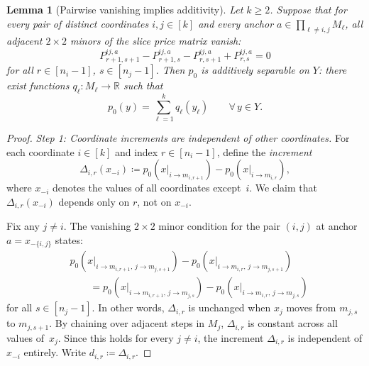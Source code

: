 \documentclass[11pt]{article}
\newtheorem{lemma}[theorem]{Lemma}
\newcommand{\R}{\mathbb{R}}
\begin{document}
\begin{lemma}[Pairwise vanishing implies additivity]\label{lem:vanishing}
Let $k \geq 2$.  Suppose that for every pair of distinct coordinates $i, j \in [k]$
and every anchor $a \in \prod_{\ell \neq i,j} M_\ell$,
all adjacent $2 \times 2$ minors of the slice price matrix vanish:
\[
  P^{ij,a}_{r+1,s+1} - P^{ij,a}_{r+1,s} - P^{ij,a}_{r,s+1} + P^{ij,a}_{r,s} = 0
\]
for all $r \in [n_i - 1]$, $s \in [n_j - 1]$.
Then $p_0$ is additively separable on $Y$: there exist functions $q_\ell\colon M_\ell \to \R$
such that
\[
  p_0(y) = \sum_{\ell=1}^k q_\ell(y_\ell) \qquad \forall\, y \in Y.
\]
\end{lemma}

\begin{proof}
\emph{Step 1: Coordinate increments are independent of other coordinates.}
For each coordinate $i \in [k]$ and index $r \in [n_i - 1]$, define the \emph{increment}
\[
  \Delta_{i,r}(x_{-i}) \coloneqq p_0(x|_{i \to m_{i,r+1}}) - p_0(x|_{i \to m_{i,r}}),
\]
where $x_{-i}$ denotes the values of all coordinates except~$i$.
We claim that $\Delta_{i,r}(x_{-i})$ depends only on $r$, not on $x_{-i}$.

Fix any $j \neq i$.  The vanishing $2\times 2$ minor condition for the pair $(i,j)$
at anchor $a = x_{-\{i,j\}}$ states:
\begin{align*}
  &p_0(x|_{i \to m_{i,r+1},\, j \to m_{j,s+1}}) - p_0(x|_{i \to m_{i,r},\, j \to m_{j,s+1}}) \\
  &\qquad = p_0(x|_{i \to m_{i,r+1},\, j \to m_{j,s}}) - p_0(x|_{i \to m_{i,r},\, j \to m_{j,s}})
\end{align*}
for all $s \in [n_j - 1]$.
In other words, $\Delta_{i,r}$ is unchanged when $x_j$ moves from $m_{j,s}$ to $m_{j,s+1}$.
By chaining over adjacent steps in $M_j$, $\Delta_{i,r}$ is constant across all values of~$x_j$.
Since this holds for every $j \neq i$, the increment $\Delta_{i,r}$ is independent of
$x_{-i}$ entirely.  Write $d_{i,r} \coloneqq \Delta_{i,r}$.


\end{proof}
\end{document}
